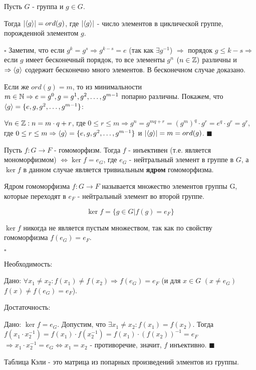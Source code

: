 \documentclass[../main.tex]{subfiles}
\begin{document}
 Пусть $G$ - группа и $g\in G$.

Тогда $\vert \langle g\rangle\vert = ord(g)$, где $\vert \langle g\rangle\vert$ - число элементов в циклической группе, порожденной элементом $g$.

\void
$\square$ Заметим, что если $g^k = g^s \Rightarrow g^{k-s} = e$ (так как $\exists g^{-1}$) $\Rightarrow$
порядок $g \leq k - s \Rightarrow$ если $g$ имеет бесконечный порядок, то все элементы $g^n$ $(n\in\mathbb{Z})$
различны и $\Rightarrow \langle g\rangle$ содержит бесконечно много элементов. В бесконечном случае доказано.

\void
Если же $ord(g) = m$, то из минимальности $m\in\mathbb{N} \Rightarrow e=g^0, g=g^1, g^2,\dots,g^{m-1}$ попарно
различны. Покажем, что $\langle g\rangle = \{e, g, g^2,\dots,g^{m-1}\}$:

$\forall n\in\mathbb{Z}: n = m\cdot q + r$, где $0\leq r \le m \Rightarrow g^n = g^{mq+r} = (g^m)^q\cdot g^r =
e^q\cdot g^r = g^r$, где $0\leq r\le m \Rightarrow \langle g\rangle = \{e,g,g^2,\dots,g^{m-1}\}$
и $\vert \langle g\rangle\vert = m = ord(g)$. $\blacksquare$

\void
{} Пусть $f: G\rightarrow F$ - гомоморфизм. Тогда $f$ - инъективен (т.е. является мономорфизмом)
$\Leftrightarrow \ker{f} = e_G$, где $e_G$ - нейтральный элемент в группе в $G$, а $\ker{f}$ в данном
случае является тривиальным \textbf{ядром} гомоморфизма.

\void
{} Ядром гомоморфизма $f: G\rightarrow F$ называется множество элементов группы G, которые переходят
в $e_F$ - нейтральный элемент во второй группе.

$$\ker{f} = \{g\in G\vert f(g) = e_F\}$$

\void
{} $\ker{f}$ никогда не является пустым множеством, так как по свойству гомоморфизма $f(e_G) = e_F$.

\void
$\square$

\fbox{$\Rightarrow$} Необходимость:

Дано: $\forall x_1 \neq x_2: f(x_1)\neq f(x_2)\Rightarrow f(e_G) = e_F$ 
(и для $x\in G$ $(x\neq e_G)$ $f(x)\neq f(e_G) = e_F$).

\fbox{$\Leftarrow$} Достаточность:

Дано: $\ker{f} = e_G$. Допустим, что $\exists x_1\neq x_2: f(x_1) = f(x_2)$.
Тогда $f(x_1\cdot x_2^{-1}) = f(x_1)\cdot f(x_2^{-1}) = f(x_1)\cdot(f(x_2))^{-1} = e_F$
$\Rightarrow x_1\cdot x_2^{-1} = e_G \Leftrightarrow x_1 = x_2$ - противоречие, значит,
$f$ инъективно. $\blacksquare$

\void
{} Таблица Кэли - это матрица из попарных произведений элментов из группы.
\end{document}
